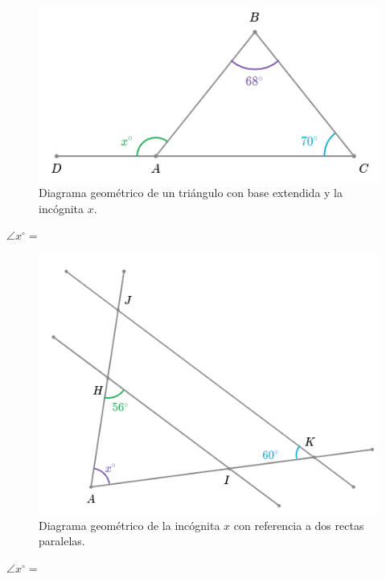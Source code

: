 \documentclass[11pt,addpoints]{exam}
\begin{document}
\begin{questions}
  \begin{minipage}[b]{0.42\textwidth}
    \begin{figure}[H]
      \includegraphics[width=\linewidth]{Images/triangle_angle_07}
      \caption{Diagrama geométrico de un tri\'angulo con base extendida y la inc\'ognita $x$.}
      \label{fig:triangle_angle_01}
    \end{figure}
    \begin{center}
      {\color{cielo}\textbf{$\angle x^\circ =$}} \fbox{
        \begin{minipage}{2cm}
          \hfill\vspace{0.5cm}
        \end{minipage}
      }
    \end{center}
  \end{minipage}
  \hspace{1cm}
  \begin{minipage}[b]{0.42\textwidth}
    \begin{figure}[H]
      \includegraphics[width=\linewidth]{Images/triangle_angle_04}
      \caption{Diagrama geométrico de la inc\'ognita $x$ con referencia a dos rectas paralelas.}
      \label{fig:triangle_angle_04}
    \end{figure}
    \begin{center}
      {\color{purplePoint}\textbf{$\angle x^\circ =$}} \fbox{
        \begin{minipage}{2cm}
          \hfill\vspace{0.5cm}
        \end{minipage}
      }
    \end{center}


\end{minipage}
\end{questions}
\end{document}
